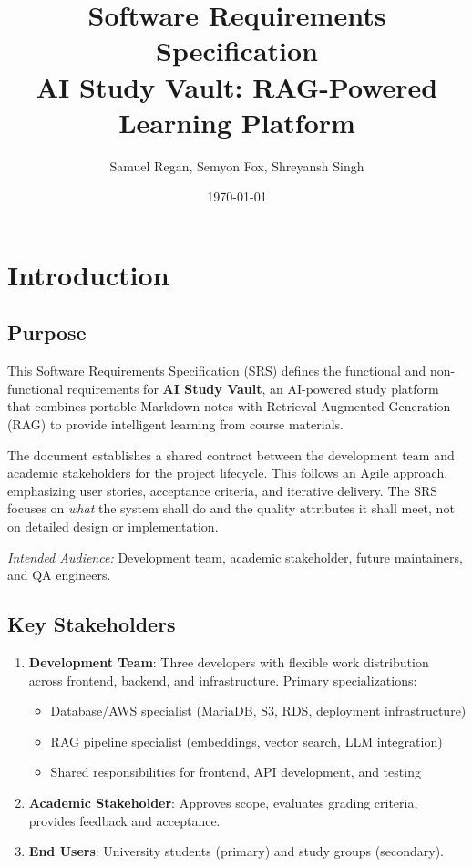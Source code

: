 \documentclass[12pt,a4paper]{article}
\title{Software Requirements Specification \\
\Large AI Study Vault: RAG-Powered Learning Platform}
\author{Samuel Regan, Semyon Fox, Shreyansh Singh}
\date{\today}
\begin{document}
\maketitle

\tableofcontents
\newpage

\section{Introduction}

\subsection{Purpose}

This Software Requirements Specification (SRS) defines the functional and non-functional requirements for \textbf{AI Study Vault}, an AI-powered study platform that combines portable Markdown notes with Retrieval-Augmented Generation (RAG) to provide intelligent learning from course materials.

The document establishes a shared contract between the development team and academic stakeholders for the project lifecycle. This follows an Agile approach, emphasizing user stories, acceptance criteria, and iterative delivery. The SRS focuses on \emph{what} the system shall do and the quality attributes it shall meet, not on detailed design or implementation.

\textit{Intended Audience:} Development team, academic stakeholder, future maintainers, and QA engineers.

\subsection{Key Stakeholders}

\begin{enumerate}
    \item \textbf{Development Team}: Three developers with flexible work distribution across frontend, backend, and infrastructure. Primary specializations:
    \begin{itemize}
        \item Database/AWS specialist (MariaDB, S3, RDS, deployment infrastructure)
        \item RAG pipeline specialist (embeddings, vector search, LLM integration)
        \item Shared responsibilities for frontend, API development, and testing
    \end{itemize}
    \item \textbf{Academic Stakeholder}: Approves scope, evaluates grading criteria, provides feedback and acceptance.
    \item \textbf{End Users}: University students (primary) and study groups (secondary).
\end{enumerate}
\end{document}
